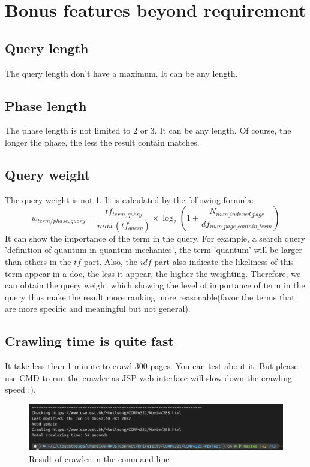 \documentclass{article}
\begin{document}
    \newpage
    \section*{Bonus features beyond requirement}
        \subsection*{Query length}
            The query length don't have a maximum. It can be any length.    
        \subsection*{Phase length}
            The phase length is not limited to 2 or 3. It can be any length. Of course, the longer the phase, the less the result contain matches.
        
        \subsection*{Query weight}
            The query weight is not 1. It is calculated by the following formula:
            \begin{equation*}
                w_{term/phase,query}=\frac{tf_{term,query}}{max(tf_{query})}\times\log_2(1+\frac{N_{num\_indexed\_page}}{df_{num\_page\_contain\_term}})
            \end{equation*}
            It can show the importance of the term in the query. For example, a search query 'definition of quantum in quantum mechanics', the term 'quantum' will be larger than others in the $tf$ part. Also, the $idf$ part also indicate the likeliness of this term appear in a doc, the less it appear, the higher the weighting. Therefore, we can obtain the query weight which showing the level of importance of term in the query thus make the result more ranking more reasonable(favor the terms that are more specific and meaningful but not general).

        \subsection*{Crawling time is quite fast}
        It take less than 1 minute to crawl 300 pages. You can test about it. But please use CMD to run the crawler as JSP web interface will slow down the crawling speed :).
        \begin{figure}[!h]
            \centering
            \label{}
            \includegraphics[width=15cm]{crawl_in_local.png}
            \caption{Result of crawler in the command line}
        \end{figure}
\end{document}
